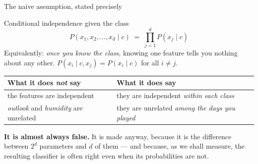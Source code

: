 \documentclass[aspectratio=169]{beamer}
\begin{document}
\begin{frame}[shrink=4]{The naive assumption, stated precisely}
  \begin{exampleblock}{Conditional independence given the class}
    \centering
    \[
      P(x_1, x_2, \ldots, x_d \mid c)
        \;=\; \prod_{j=1}^{d} P(x_j \mid c)
    \]
    \small Equivalently: \emph{once you know the class}, knowing one feature
    tells you nothing about any other.
    $P(x_i \mid c, x_j) = P(x_i \mid c)$ for all $i \neq j$.
  \end{exampleblock}
  \begin{center}\small
  \begin{tabular}{@{}ll@{}}
    \toprule
    \textbf{What it does \emph{not} say} & \textbf{What it does say}\\
    \midrule
    the features are independent & they are independent \emph{within each
      class}\\
    \emph{outlook} and \emph{humidity} are unrelated & they are unrelated
      \emph{among the days you played}\\
    \bottomrule
  \end{tabular}
  \end{center}
  \begin{alertblock}{}
    \centering\footnotesize
    \textbf{It is almost always false.} It is made anyway, because it is the
    difference between $2^d$ parameters and $d$ of them --- and because, as we
    shall measure, the resulting classifier is often right even when its
    probabilities are not.
  \end{alertblock}
\end{frame}
\end{document}
